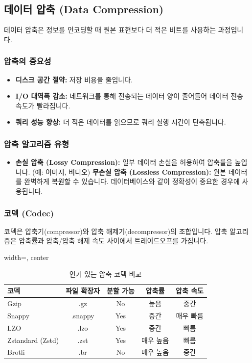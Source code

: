 \documentclass[11pt,a4paper]{article}
\theoremstyle{definition}
\begin{document}
\subsection{데이터 압축 (Data Compression)}
데이터 압축은 정보를 인코딩할 때 원본 표현보다 더 적은 비트를 사용하는 과정입니다.

\subsubsection{압축의 중요성}
\begin{itemize}
    \item \textbf{디스크 공간 절약:} 저장 비용을 줄입니다.
    \item \textbf{I/O 대역폭 감소:} 네트워크를 통해 전송되는 데이터 양이 줄어들어 데이터 전송 속도가 빨라집니다.
    \item \textbf{쿼리 성능 향상:} 더 적은 데이터를 읽으므로 쿼리 실행 시간이 단축됩니다.
\end{itemize}

\subsubsection{압축 알고리즘 유형}
\begin{itemize}
    \item \textbf{손실 압축 (Lossy Compression):} 일부 데이터 손실을 허용하여 압축률을 높입니다. (예: 이미지, 비디오)
    \textbf{무손실 압축 (Lossless Compression):} 원본 데이터를 완벽하게 복원할 수 있습니다. 데이터베이스와 같이 정확성이 중요한 경우에 사용됩니다.
\end{itemize}

\subsubsection{코덱 (Codec)}
코덱은 압축기(compressor)와 압축 해제기(decompressor)의 조합입니다. 압축 알고리즘은 압축률과 압축/압축 해제 속도 사이에서 트레이드오프를 가집니다.

\begin{table}[h!]
\centering
\caption{인기 있는 압축 코덱 비교}
\label{tab:compression_codecs}
\begin{adjustbox}{width=\textwidth, center}
\begin{tabular}{lcccc}
\toprule
\textbf{코덱} & \textbf{파일 확장자} & \textbf{분할 가능} & \textbf{압축률} & \textbf{압축 속도} \\
\midrule
Gzip & .gz & No & 높음 & 중간 \\
Snappy & .snappy & Yes & 중간 & 매우 빠름 \\
LZO & .lzo & Yes & 중간 & 빠름 \\
Zstandard (Zstd) & .zst & Yes & 매우 높음 & 빠름 \\
Brotli & .br & No & 매우 높음 & 중간 \\
\bottomrule
\end{tabular}
\end{adjustbox}
\end{table}
\end{document}
